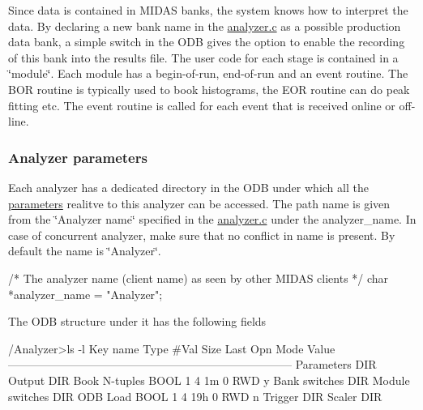 Since data is contained in MIDAS banks, the system knows how to interpret the data. By declaring a new bank name in the \hyperlink{analyzer_8c}{analyzer.c} as a possible production data bank, a simple switch in the ODB gives the option to enable the recording of this bank into the results file. The user code for each stage is contained in a \char`\"{}module\char`\"{}. Each module has a begin-\/of-\/run, end-\/of-\/run and an event routine. The BOR routine is typically used to book histograms, the EOR routine can do peak fitting etc. The event routine is called for each event that is received online or off-\/line.\hypertarget{DataAnalysis_Analyzer_parameters}{}\subsubsection{Analyzer parameters}\label{DataAnalysis_Analyzer_parameters}
Each analyzer has a dedicated directory in the ODB under which all the \hyperlink{structparameters}{parameters} realitve to this analyzer can be accessed. The path name is given from the \char`\"{}Analyzer name\char`\"{} specified in the \hyperlink{analyzer_8c}{analyzer.c} under the analyzer\_\-name. In case of concurrent analyzer, make sure that no conflict in name is present. By default the name is \char`\"{}Analyzer\char`\"{}. 
\begin{DoxyCode}
/* The analyzer name (client name) as seen by other MIDAS clients   */
char *analyzer_name = "Analyzer";
\end{DoxyCode}


The ODB structure under it has the following fields 
\begin{DoxyCode}
/Analyzer>ls -l
Key name                        Type    #Val  Size  Last Opn Mode Value
---------------------------------------------------------------------------
Parameters                      DIR
Output                          DIR
Book N-tuples                   BOOL    1     4     1m   0   RWD  y
Bank switches                   DIR
Module switches                 DIR
ODB Load                        BOOL    1     4     19h  0   RWD  n
Trigger                         DIR
Scaler                          DIR
\end{DoxyCode}



